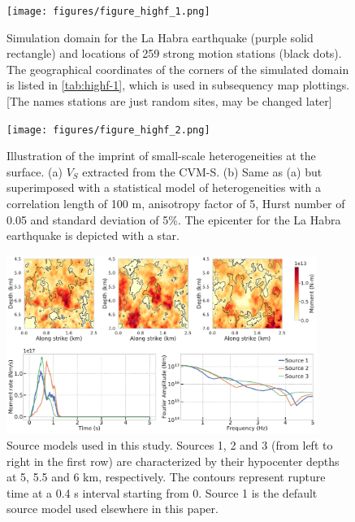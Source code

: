\clearpage


\begin{figure}[!ht]
  \centering
  \texttt{[image: figures/figure\_highf\_1.png]}
  \caption{Simulation domain for the La Habra earthquake (purple solid rectangle) and locations of 259 strong motion stations (black dots). The geographical coordinates of the corners of the simulated domain is listed in \cref{tab:highf-1}, which is used in subsequency map plottings. [The names stations are just random sites, may be changed later]}
  \label{fig:highf-1}
\end{figure}
\clearpage

\begin{figure}[!ht]
  \centering
  \texttt{[image: figures/figure\_highf\_2.png]}
  \caption{Illustration of the imprint of small-scale heterogeneities at the surface. (a) $V_S$ extracted from the CVM-S. (b) Same as (a) but superimposed with a statistical model of heterogeneities with a correlation length of 100 m, anisotropy factor of 5, Hurst number of 0.05 and standard deviation of 5\%. The epicenter for the La Habra earthquake is depicted with a star.}
  \label{fig:highf-2}
\end{figure}
\clearpage

\begin{figure}[!ht]
  \includegraphics[width=0.9\textwidth,height=0.9\textheight,keepaspectratio]{figures/figure_highf_3.pdf}
  \caption{Source models used in this study. Sources 1, 2 and 3 (from left to right in the first row) are characterized by their hypocenter depths at 5, 5.5 and 6 km, respectively. The contours represent rupture time at a 0.4 s interval starting from 0. Source 1 is the default source model used elsewhere in this paper.}
  \label{fig:highf-3}
\end{figure}
\clearpage

